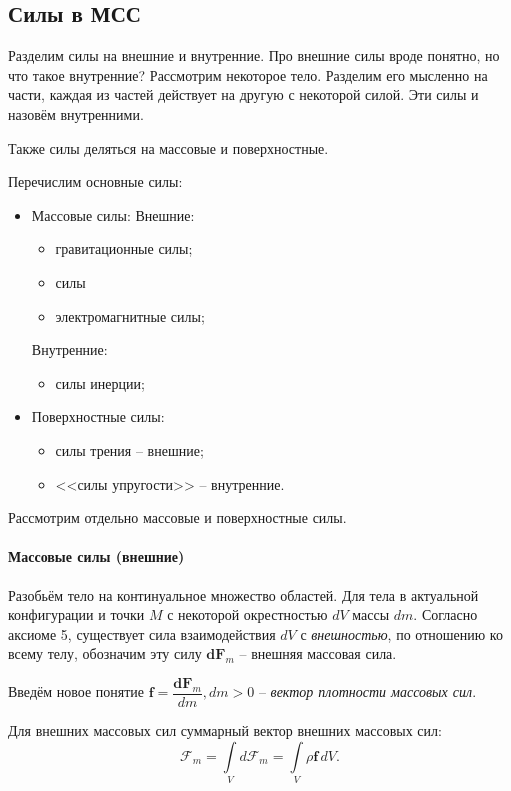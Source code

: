 \subsection{Силы в МСС}

Разделим силы на внешние и внутренние. Про внешние силы вроде понятно, но что
такое внутренние? Рассмотрим некоторое тело. Разделим его
мысленно на части, каждая из частей действует на другую с некоторой силой.
Эти силы и назовём внутренними.

Также силы деляться на массовые и поверхностные.

Перечислим основные силы:
\begin{itemize}
  \item Массовые силы:
    Внешние:
    \begin{itemize}
      \item гравитационные силы;
      \item силы 
      \item электромагнитные силы;
    \end{itemize}
    Внутренние:
    \begin{itemize}
      \item силы инерции;
    \end{itemize}

  \item Поверхностные силы:
    \begin{itemize}
      \item силы трения -- внешние;
      \item <<силы упругости>> -- внутренние.
    \end{itemize}
\end{itemize}

Рассмотрим отдельно массовые и поверхностные силы.

\paragraph{Массовые силы (внешние)}
Разобьём тело на континуальное множество областей.
Для тела в актуальной конфигурации и точки $M$ с некоторой окрестностью $dV$ массы
$dm$. Согласно аксиоме 5, существует сила взаимодействия $dV$ с \emph{внешностью}, 
по отношению ко всему телу, обозначим эту силу $\mathbf{dF}_m$ -- внешняя массовая сила.

Введём новое понятие $\mathbf{f} = \dfrac{\mathbf{dF}_m}{dm}, dm > 0$ -- 
\emph{вектор плотности массовых сил}.

Для внешних массовых сил суммарный вектор внешних массовых сил:
\[
  \mathbf{\mathcal{F}}_m = \int\limits_V d\mathbf{\mathcal{F}}_m
  = \int\limits_V \rho \mathbf{f} \, dV.
\]

